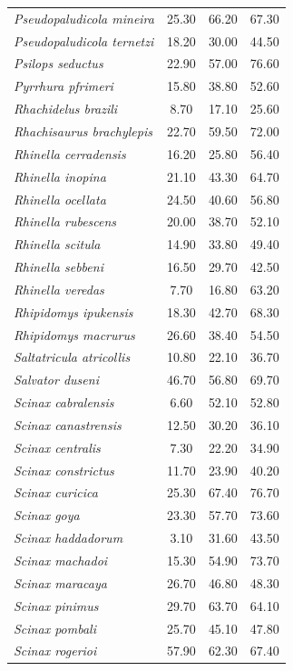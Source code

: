 \documentclass[12pt,openright,oneside,a4paper,english]{abntex2}
\begin{document}
\begin{longtable}{lccc}
	\textit{Pseudopaludicola mineira}&25.30 &66.20 &67.30 \\
	\textit{Pseudopaludicola ternetzi}&18.20 &30.00 &44.50 \\
	\textit{Psilops seductus}&22.90 &57.00 &76.60 \\
	\textit{Pyrrhura pfrimeri}&15.80 &38.80 &52.60 \\
	\textit{Rhachidelus brazili}&8.70 &17.10 &25.60 \\
	\textit{Rhachisaurus brachylepis}&22.70 &59.50 &72.00 \\
	\textit{Rhinella cerradensis}&16.20 &25.80 &56.40 \\
	\textit{Rhinella inopina}&21.10 &43.30 &64.70 \\
	\textit{Rhinella ocellata}&24.50 &40.60 &56.80 \\
	\textit{Rhinella rubescens}&20.00 &38.70 &52.10 \\
	\textit{Rhinella scitula}&14.90 &33.80 &49.40 \\
	\textit{Rhinella sebbeni}&16.50 &29.70 &42.50 \\
	\textit{Rhinella veredas}&7.70 &16.80 &63.20 \\
	\textit{Rhipidomys ipukensis}&18.30 &42.70 &68.30 \\
	\textit{Rhipidomys macrurus}&26.60 &38.40 &54.50 \\
	\textit{Saltatricula atricollis}&10.80 &22.10 &36.70 \\
	\textit{Salvator duseni}&46.70 &56.80 &69.70 \\
	\textit{Scinax cabralensis}&6.60 &52.10 &52.80 \\
	\textit{Scinax canastrensis}&12.50 &30.20 &36.10 \\
	\textit{Scinax centralis}&7.30 &22.20 &34.90 \\
	\textit{Scinax constrictus}&11.70 &23.90 &40.20 \\
	\textit{Scinax curicica}&25.30 &67.40 &76.70 \\
	\textit{Scinax goya}&23.30 &57.70 &73.60 \\
	\textit{Scinax haddadorum}&3.10 &31.60 &43.50 \\
	\textit{Scinax machadoi}&15.30 &54.90 &73.70 \\
	\textit{Scinax maracaya}&26.70 &46.80 &48.30 \\
	\textit{Scinax pinimus}&29.70 &63.70 &64.10 \\
	\textit{Scinax pombali}&25.70 &45.10 &47.80 \\
	\textit{Scinax rogerioi}&57.90 &62.30 &67.40 \\

\end{longtable}
\end{document}
